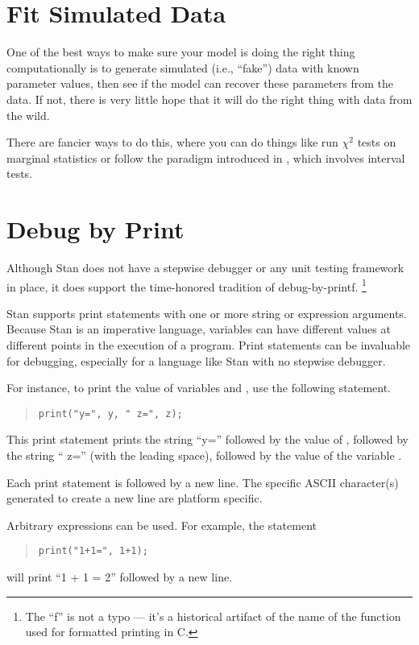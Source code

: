 \section{Fit Simulated Data}

One of the best ways to make sure your model is doing the right thing
computationally is to generate simulated (i.e., ``fake'') data with
known parameter values, then see if the model can recover these
parameters from the data.  If not, there is very little hope that it
will do the right thing with data from the wild.  

There are fancier ways to do this, where you can do things like run
$\chi^2$ tests on marginal statistics or follow the paradigm
introduced in \citep{CookGelmanRubin:2006}, which involves interval
tests.  

\section{Debug by Print}

Although Stan does not have a stepwise debugger or any unit testing
framework in place, it does support the time-honored tradition of
debug-by-printf.
%
\footnote{The ``f'' is not a typo --- it's a historical artifact of
  the name of the  function used for formatted printing
  in C.} 

Stan supports print statements with one or more string or expression
arguments.  Because Stan is an imperative language, variables can have
different values at different points in the execution of a program.
Print statements can be invaluable for debugging, especially for a
language like Stan with no stepwise debugger.

For instance, to print the value of variables  and
, use the following statement.
%
\begin{quote}
\begin{Verbatim}[fontsize=\small]
print("y=", y, " z=", z);
\end{Verbatim}
\end{quote}
%
This print statement prints the string ``y='' followed by the value of
, followed by the string `` z=''
(with the leading space), followed by the value of the variable
.

Each print statement is followed by a new line.  The specific ASCII
character(s) generated to create a new line are platform specific.

Arbitrary expressions can be used.  For example, the statement
\begin{quote}
\begin{Verbatim}[fontsize=\small]
print("1+1=", 1+1);
\end{Verbatim}
\end{quote}
%
will print ``1 + 1 = 2'' followed by a new line.

